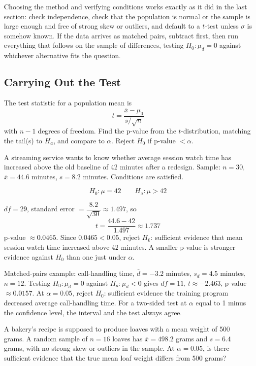 Choosing the method and verifying conditions works exactly as it did in the last section: check independence, check that the population is normal or the sample is large enough and free of strong skew or outliers, and default to a $t$-test unless $\sigma$ is somehow known. If the data arrives as matched pairs, subtract first, then run everything that follows on the sample of differences, testing $H_0: \mu_d = 0$ against whichever alternative fits the question.
 
\subsection{Carrying Out the Test}

The test statistic for a population mean is
\[
t = \dfrac{\bar{x} - \mu_0}{s / \sqrt{n}}
\]
with $n - 1$ degrees of freedom. Find the p-value from the $t$-distribution, matching the tail(s) to $H_a$, and compare to $\alpha$. Reject $H_0$ if p-value $< \alpha$.

A streaming service wants to know whether average session watch time has increased above the old baseline of 42 minutes after a redesign. Sample: $n = 30$, $\bar{x} = 44.6$ minutes, $s = 8.2$ minutes. Conditions are satisfied.

\[
H_0: \mu = 42 \qquad H_a: \mu > 42
\]

$df = 29$, standard error $= \dfrac{8.2}{\sqrt{30}} \approx 1.497$, so
\[
t = \dfrac{44.6 - 42}{1.497} \approx 1.737
\]
p-value $\approx 0.0465$. Since $0.0465 < 0.05$, reject $H_0$: sufficient evidence that mean session watch time increased above 42 minutes. A smaller p-value is stronger evidence against $H_0$ than one just under $\alpha$.

Matched-pairs example: call-handling time, $\bar{d} = -3.2$ minutes, $s_d = 4.5$ minutes, $n = 12$. Testing $H_0: \mu_d = 0$ against $H_a: \mu_d < 0$ gives $df = 11$, $t \approx -2.463$, p-value $\approx 0.0157$. At $\alpha = 0.05$, reject $H_0$: sufficient evidence the training program decreased average call-handling time. For a two-sided test at $\alpha$ equal to 1 minus the confidence level, the interval and the test always agree.
 
\begin{Exercise}[title={Setting Up and Testing a Claim}, label={ex:means-test-bakery}]
A bakery's recipe is supposed to produce loaves with a mean weight of 500 grams. A random sample of $n = 16$ loaves has $\bar{x} = 498.2$ grams and $s = 6.4$ grams, with no strong skew or outliers in the sample. At $\alpha = 0.05$, is there sufficient evidence that the true mean loaf weight differs from 500 grams?
\end{Exercise}
 
